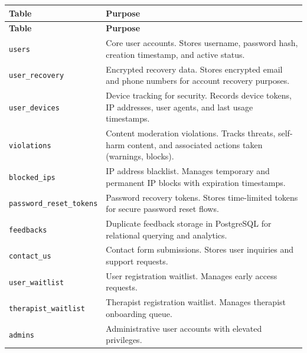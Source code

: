 \documentclass[11pt,a4paper]{article}
\begin{document}
\begin{longtable}{|p{4cm}|p{10cm}|}
\hline
\rowcolor{postgresblue!20}
\textbf{Table} & \textbf{Purpose} \\
\hline
\endfirsthead

\hline
\rowcolor{postgresblue!20}
\textbf{Table} & \textbf{Purpose} \\
\hline
\endhead

\texttt{users} & Core user accounts. Stores username, password hash, creation timestamp, and active status. \\
\hline

\texttt{user\_recovery} & Encrypted recovery data. Stores encrypted email and phone numbers for account recovery purposes. \\
\hline

\texttt{user\_devices} & Device tracking for security. Records device tokens, IP addresses, user agents, and last usage timestamps. \\
\hline

\texttt{violations} & Content moderation violations. Tracks threats, self-harm content, and associated actions taken (warnings, blocks). \\
\hline

\texttt{blocked\_ips} & IP address blacklist. Manages temporary and permanent IP blocks with expiration timestamps. \\
\hline

\texttt{password\_reset\_tokens} & Password recovery tokens. Stores time-limited tokens for secure password reset flows. \\
\hline

\texttt{feedbacks} & Duplicate feedback storage in PostgreSQL for relational querying and analytics. \\
\hline

\texttt{contact\_us} & Contact form submissions. Stores user inquiries and support requests. \\
\hline

\texttt{user\_waitlist} & User registration waitlist. Manages early access requests. \\
\hline

\texttt{therapist\_waitlist} & Therapist registration waitlist. Manages therapist onboarding queue. \\
\hline

\texttt{admins} & Administrative user accounts with elevated privileges. \\
\hline


\end{longtable}
\end{document}
